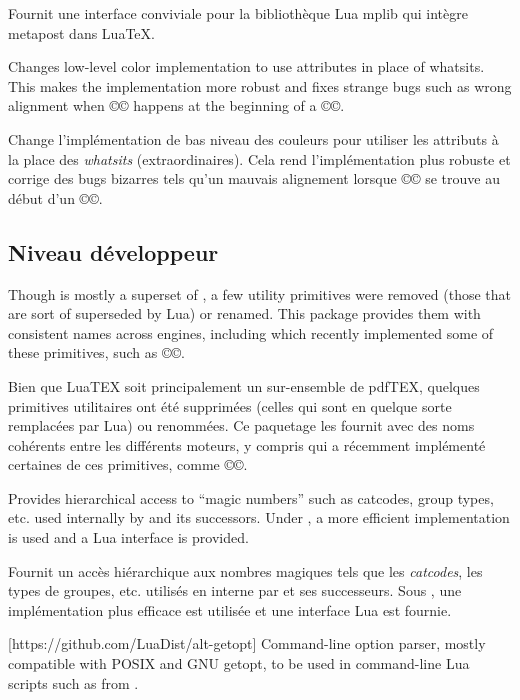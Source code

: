 \documentclass{lltxdoc}
\begin{document}
Fournit une interface conviviale pour la bibliothèque Lua mplib qui intègre metapost dans LuaTeX.

Changes low-level color implementation to use \luatex attributes in place of
whatsits. This makes the implementation more robust and fixes strange bugs
such as wrong alignment when ©\color© happens at the beginning of a ©\vbox©.

Change l'implémentation de bas niveau des couleurs pour utiliser les attributs \luatex à la place des \emph{whatsits} ( extraordinaires\fg). Cela rend l'implémentation plus robuste et corrige des bugs bizarres tels qu'un mauvais alignement lorsque ©\color© se trouve au début d'un ©\vbox©.

\subsection{Niveau développeur}

Though \luatex is mostly a superset of \pdftex, a few utility primitives were
removed (those that are sort of superseded by Lua) or renamed. This package
provides them with consistent names across engines, including \xetex which
recently implemented some of these primitives, such as ©\strcmp©.

Bien que LuaTEX soit principalement un sur-ensemble de pdfTEX, quelques primitives utilitaires ont été supprimées (celles qui sont en quelque sorte remplacées par Lua) ou renommées. Ce paquetage les fournit avec des noms cohérents entre les différents moteurs, y compris \xetex qui a récemment implémenté certaines de ces primitives, comme ©\strcmp©.
%

Provides hierarchical access to ``magic numbers'' such as catcodes, group
types, etc. used internally by \tex and its successors. Under \luatex, a more
efficient implementation is used and a Lua interface is provided.

Fournit un accès hiérarchique aux \og{}nombres magiques\fg{} tels que les \emph{catcodes}, les types de groupes, etc. utilisés en interne par \tex et ses successeurs. Sous \luatex, une implémentation plus efficace est utilisée et une interface Lua est fournie.

[https://github.com/LuaDist/alt-getopt]
Command-line option parser, mostly compatible with POSIX and GNU getopt, to be
used in command-line Lua scripts such as  from
.
\end{document}
